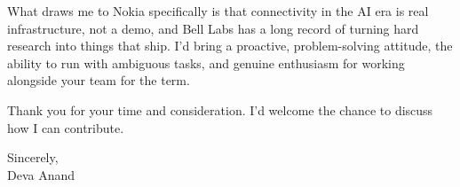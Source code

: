 \documentclass[letterpaper,11pt]{article}
\begin{document}
What draws me to Nokia specifically is that connectivity in the AI era is real infrastructure, not a demo, and Bell Labs has a long record of turning hard research into things that ship. I'd bring a proactive, problem-solving attitude, the ability to run with ambiguous tasks, and genuine enthusiasm for working alongside your team for the term.

\vspace{4pt}
Thank you for your time and consideration. I'd welcome the chance to discuss how I can contribute.

\vspace{8pt}
Sincerely, \\
Deva Anand
\end{document}
